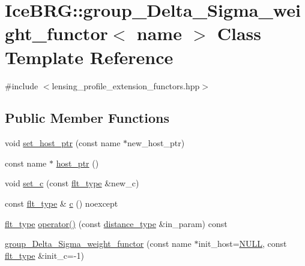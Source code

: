 \hypertarget{classIceBRG_1_1group__Delta__Sigma__weight__functor}{\section{Ice\-B\-R\-G\-:\-:group\-\_\-\-Delta\-\_\-\-Sigma\-\_\-weight\-\_\-functor$<$ name $>$ Class Template Reference}
\label{classIceBRG_1_1group__Delta__Sigma__weight__functor}
}


{\ttfamily \#include $<$lensing\-\_\-profile\-\_\-extension\-\_\-functors.\-hpp$>$}

\subsection*{Public Member Functions}
\begin{DoxyCompactItemize}
\item 
void \hyperlink{classIceBRG_1_1group__Delta__Sigma__weight__functor_a7604f13fcc78df74617c382c5fb5c5d6}{set\-\_\-host\-\_\-ptr} (const name $\ast$new\-\_\-host\-\_\-ptr)
\item 
const name $\ast$ \hyperlink{classIceBRG_1_1group__Delta__Sigma__weight__functor_a743ad713470220e5ef291fb3a51f1665}{host\-\_\-ptr} ()
\item 
void \hyperlink{classIceBRG_1_1group__Delta__Sigma__weight__functor_aeb4f683bdc69e22b52df8c393815cc5c}{set\-\_\-c} (const \hyperlink{lib_2IceBRG__main_2common_8h_ad0f130a56eeb944d9ef2692ee881ecc4}{flt\-\_\-type} \&new\-\_\-c)
\item 
const \hyperlink{lib_2IceBRG__main_2common_8h_ad0f130a56eeb944d9ef2692ee881ecc4}{flt\-\_\-type} \& \hyperlink{classIceBRG_1_1group__Delta__Sigma__weight__functor_a895307cc8ca91afe783e4003cd31f158}{c} () noexcept
\item 
\hyperlink{lib_2IceBRG__main_2common_8h_ad0f130a56eeb944d9ef2692ee881ecc4}{flt\-\_\-type} \hyperlink{classIceBRG_1_1group__Delta__Sigma__weight__functor_acfd67130c53a190b42addf42be6ad48a}{operator()} (const \hyperlink{namespaceIceBRG_a45499647eb87e24c10ab32c628711cec}{distance\-\_\-type} \&in\-\_\-param) const 
\item 
\hyperlink{classIceBRG_1_1group__Delta__Sigma__weight__functor_ad13731848c1217c780caa3b7e6320e0e}{group\-\_\-\-Delta\-\_\-\-Sigma\-\_\-weight\-\_\-functor} (const name $\ast$init\-\_\-host=\hyperlink{lib_2IceBRG__main_2common_8h_a070d2ce7b6bb7e5c05602aa8c308d0c4}{N\-U\-L\-L}, const \hyperlink{lib_2IceBRG__main_2common_8h_ad0f130a56eeb944d9ef2692ee881ecc4}{flt\-\_\-type} \&init\-\_\-c=-\/1)
\end{DoxyCompactItemize}


